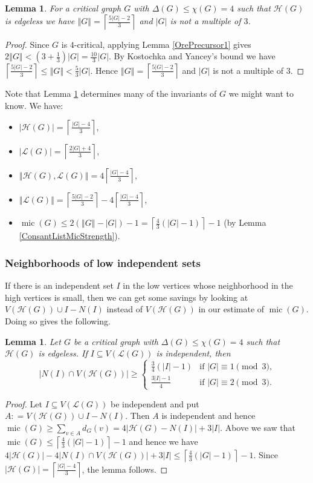 \documentclass[12pt]{article}
\theoremstyle{plain}
\newtheorem{lem}[thm]{Lemma}
\theoremstyle{definition}
\theoremstyle{remark}
\newcommand{\fancy}[1]{\mathcal{#1}}
\renewcommand{\L}{\fancy{L}}
\newcommand{\HH}{\fancy{H}}
\newcommand{\card}[1]{\left|#1\right|}
\newcommand{\size}[1]{\left\Vert#1\right\Vert}
\newcommand{\ceil}[1]{\left\lceil#1\right\rceil}
\newcommand{\parens}[1]{\left( #1 \right)}
\newcommand{\DefinedAs}{\mathrel{\mathop:}=}
\newcommand{\mic}{\operatorname{mic}}
\begin{document}
\begin{lem}\label{EdgesIn4Critical}
For a critical graph $G$ with $\Delta(G) \leq \chi(G) = 4$ such that $\HH(G)$ is edgeless we have $\size{G} = \ceil{\frac{5\card{G} - 2}{3}}$ and $\card{G}$ is not a multiple of $3$.
\end{lem}
\begin{proof}
Since $G$ is $4$-critical, applying Lemma \ref{OrePrecursor1} gives $2\size{G} < \parens{3 + \frac13}\card{G} = \frac{10}{3}\card{G}$.  By Kostochka and Yancey's bound we have $\ceil{\frac{5\card{G}-2}{3}} \leq \size{G} < \frac{5}{3}\card{G}$.  Hence $\size{G} = \ceil{\frac{5\card{G} - 2}{3}}$ and $\card{G}$ is not a multiple of $3$.
\end{proof}

Note that Lemma \ref{EdgesIn4Critical} determines many of the invariants of $G$ we might want to know. We have:

\begin{itemize}
\item $\card{\HH(G)} = \ceil{\frac{\card{G} - 4}{3}}$,
\item $\card{\L(G)} = \ceil{\frac{2\card{G} + 4}{3}}$,
\item $\size{\HH(G), \L(G)} = 4 \ceil{\frac{\card{G} - 4}{3}}$,
\item $\size{\L(G)} = \ceil{\frac{5\card{G} - 2}{3}} - 4 \ceil{\frac{\card{G} - 4}{3}}$,
\item $\mic(G) \leq 2(\size{G} - \card{G}) - 1 = \ceil{\frac43(\card{G}-1)} - 1$ (by Lemma \ref{ConsantListMicStrength}).
\end{itemize}
\subsubsection{Neighborhoods of low independent sets}
If there is an independent set $I$ in the low vertices whose neighborhood in the high vertices is small, then we can get some savings by looking at $V(\HH(G)) \cup I - N(I)$ instead of $V(\HH(G))$ in our estimate of $\mic(G)$.  Doing so gives the following.

\begin{lem}\label{LowIndependentSet}
Let $G$ be a critical graph with $\Delta(G) \leq \chi(G) = 4$ such that $\HH(G)$ is edgeless.  If $I \subseteq V(\L(G))$ is independent, then 
\[\card{N(I) \cap V(\HH(G))} \geq 
\begin{cases} \frac34(\card{I} - 1) & \text{if $\card{G} \equiv 1 \pmod{3}$,}\\
\frac{3\card{I} - 1}{4} & \text{if $\card{G} \equiv 2 \pmod{3}$.}
\end{cases}\]
\end{lem}
\begin{proof}
Let $I \subseteq V(\L(G))$ be independent and put $A \DefinedAs V(\HH(G)) \cup I - N(I)$.  Then $A$ is independent and hence $\mic(G) \geq \sum_{v \in A} d_G(v) = 4\card{\HH(G) - N(I)} + 3\card{I}$.  Above we saw that $\mic(G) \leq \ceil{\frac43(\card{G}-1)} - 1$ and hence we have $4\card{\HH(G)} - 4\card{N(I) \cap V(\HH(G))} + 3\card{I} \leq \ceil{\frac43(\card{G}-1)} - 1$.  Since  $\card{\HH(G)} = \ceil{\frac{\card{G} - 4}{3}}$, the lemma follows.
\end{proof}
\end{document}
